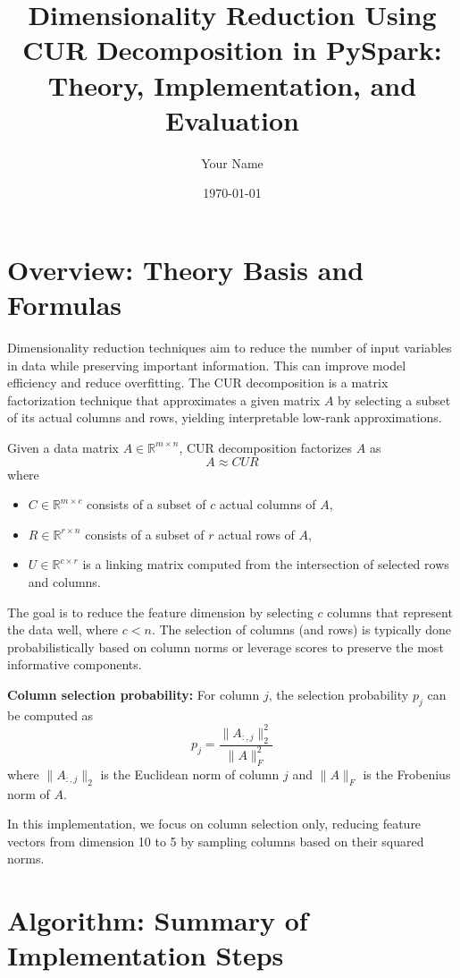\documentclass[a4paper,12pt]{article}
\title{Dimensionality Reduction Using CUR Decomposition in PySpark: Theory, Implementation, and Evaluation}
\author{Your Name}
\date{\today}
\begin{document}
\maketitle

\section{Overview: Theory Basis and Formulas}

Dimensionality reduction techniques aim to reduce the number of input variables in data while preserving important information. This can improve model efficiency and reduce overfitting. The CUR decomposition is a matrix factorization technique that approximates a given matrix \( A \) by selecting a subset of its actual columns and rows, yielding interpretable low-rank approximations.

Given a data matrix \( A \in \mathbb{R}^{m \times n} \), CUR decomposition factorizes \( A \) as
\[
A \approx CUR
\]
where
\begin{itemize}
    \item \( C \in \mathbb{R}^{m \times c} \) consists of a subset of \( c \) actual columns of \( A \),
    \item \( R \in \mathbb{R}^{r \times n} \) consists of a subset of \( r \) actual rows of \( A \),
    \item \( U \in \mathbb{R}^{c \times r} \) is a linking matrix computed from the intersection of selected rows and columns.
\end{itemize}

The goal is to reduce the feature dimension by selecting \( c \) columns that represent the data well, where \( c < n \). The selection of columns (and rows) is typically done probabilistically based on column norms or leverage scores to preserve the most informative components.

\textbf{Column selection probability:} For column \( j \), the selection probability \( p_j \) can be computed as
\[
p_j = \frac{\| A_{:,j} \|_2^2}{\| A \|_F^2}
\]
where \( \| A_{:,j} \|_2 \) is the Euclidean norm of column \( j \) and \( \| A \|_F \) is the Frobenius norm of \( A \).

In this implementation, we focus on column selection only, reducing feature vectors from dimension 10 to 5 by sampling columns based on their squared norms.

\section{Algorithm: Summary of Implementation Steps}
\end{document}
